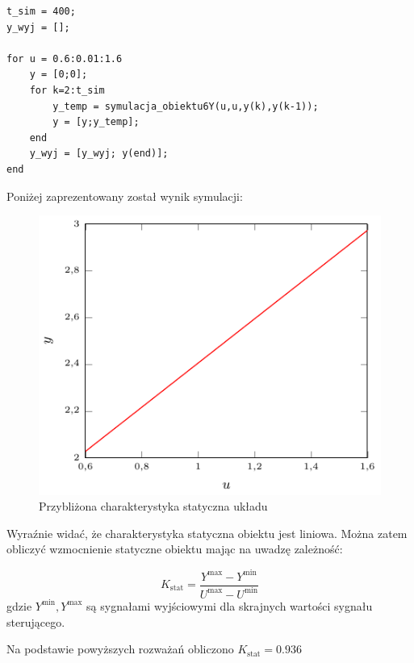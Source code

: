 \begin{lstlisting}[style=Matlab-editor]
t_sim = 400;
y_wyj = [];

for u = 0.6:0.01:1.6
    y = [0;0];
    for k=2:t_sim
        y_temp = symulacja_obiektu6Y(u,u,y(k),y(k-1));
        y = [y;y_temp];
    end
    y_wyj = [y_wyj; y(end)];
end
\end{lstlisting}
Poniżej zaprezentowany został wynik symulacji:
\begin{figure}[tb] 
\centering 
\includegraphics[scale=1.4]{wykresy/zad1_2/char_stat.pdf} 
\caption{Przybliżona charakterystyka statyczna układu} 
\end{figure}
Wyraźnie widać, że charakterystyka statyczna obiektu jest liniowa. Można zatem obliczyć wzmocnienie statyczne obiektu mając na uwadzę zależność:

\begin{equation}
K_{\textrm{stat}} = \frac{Y^{\textrm{max}} - Y^{\textrm{min}}}{U^{\textrm{max}} - U^{\textrm{min}}}
\end{equation}
gdzie $Y^{\textrm{min}}, Y^{\textrm{max}}$ są sygnałami wyjściowymi dla skrajnych wartości sygnału sterującego.
\par Na podstawie powyższych rozważań obliczono $K_{\textrm{stat}} = \num{0.936}$



